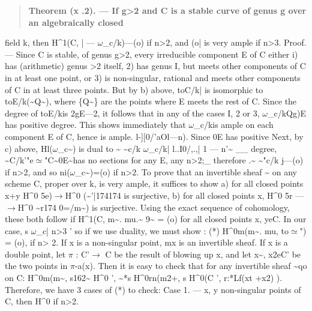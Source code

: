 \documentclass[11pt]{article}
\theoremstyle{plain}
\theoremstyle{definition}
\theoremstyle{remark}
\begin{document}
\begin{quote}\textbf{Theorem (x .2). --- If g>2 and C is a stable curve of genus g over an algebraically closed}\end{quote}
field k, then H\textasciicircum{}1(C, | --- $\omega$\_c/k)---(o) if n>2, and (o| is very ample if n>3. Proof. --- Since C is stable, of genus g>2, every irreducible component E of C either i) has (arithmetic) genus >2 itself, 2) has genus I, but meets other components of C in at least one point, or 3) is non-singular, rational and meets other components of C in at least three points. But by b) above, toC/k| is isomorphic to toE/k(\textasciitilde{}Q\textasciitilde{}), where \{Q\textasciitilde{}\} are the points where E meets the rest of C. Since the degree of toE/kis 2gE---2, it follows that in any of the cases I, 2 or 3, $\omega$\_c/kQg)E has positive degree. This shows immediately that $\omega$\_c/kis ample on each component E of C, hence is ample. l-][0/'aOl---n). Since 0E has positive Next, by c) above, Hl($\omega$\_c\textasciitilde{}) is dual to \textasciitilde{} \textasciitilde{}c/k $\omega$\_c/k| l..I0/,.,| 1 --- n'\textasciitilde{} \_\_ degree, \textasciitilde{}C/k'"e$\simeq$"C\textasciitilde{}0E\textasciitilde{}has no sections for any E, any n>2;\_ therefore .\textasciitilde{} \textasciitilde{}"c/k j---(o) if n>2, and so ni($\omega$\_c\textasciitilde{})=(o) if n>2. To prove that an invertible sheaf \textasciitilde{} on any scheme C, proper over k, is very ample, it suffices to show a) for all closed points x+y H\textasciicircum{}0 5e)$\to$H\textasciicircum{}0 (\textasciitilde{}'|174174 is surjective, b) for all closed points x, H\textasciicircum{}0 5r ---$\to$H\textasciicircum{}0 \textasciitilde{}r174 0=/m\textasciitilde{}) is surjective. Using the exact sequence of cohomology, these both follow if H\textasciicircum{}1(C, m\textasciitilde{}. mu.\textasciitilde{} 9\textasciitilde{} = (o) for all closed points x, yeC. In our case, s $\omega$\_c| n>3 ' so if we use duality, we must show : (*) H\textasciicircum{}0m(m\textasciitilde{}. mu, to$\simeq$") = (o), if n> 2. If x is a non-singular point, mx is an invertible sheaf. If x is a double point, let $\pi$ : C'$\to$ C be the result of blowing up x, and let x\textasciitilde{}, x2eC' be the two points in $\pi$-a(x). Then it is easy to check that for any invertible sheaf \textasciitilde{}qo on C: H\textasciicircum{}0m(m\textasciitilde{}, s162\textasciitilde{} H\textasciicircum{}0 ', \textasciitilde{}*s H\textasciicircum{}0rn(m2+, s H\textasciicircum{}0(C ', r:*Lf(xt +x2) ). Therefore, we have 3 cases of (*) to check: Case 1. --- x, y non-singular points of C, then H\textasciicircum{}0 if n>2.
\end{document}

